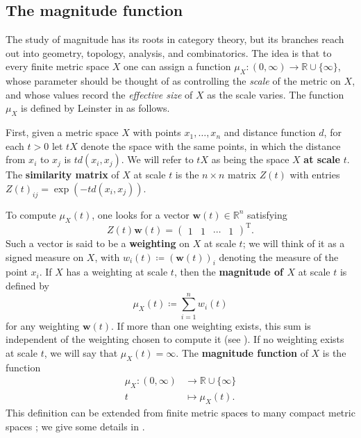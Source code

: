 \documentclass[a4paper, oneside, reqno]{amsart}
\theoremstyle{definition}
\theoremstyle{remark}
\numberwithin{equation}{section}
\renewcommand{\vec}{\mathbf}
\newcommand{\transpose}{\mathrm{T}}
\newcommand{\R}{\mathbb{R}}
\newcommand{\define}{\textbf}
\begin{document}

\subsection{The magnitude function}
\label{subsec:magnitude-function}

The study of magnitude has its roots in category theory, but its branches reach out into geometry, topology, analysis, and combinatorics. The idea is that to every finite metric space \(X\) one can assign a function \(\mu_X \colon (0, \infty) \to \R \cup \{\infty\}\), whose parameter should be thought of as controlling the \emph{scale} of the metric on \(X\), and whose values record the \emph{effective size} of \(X\) as the scale varies. The function \(\mu_X\) is defined by Leinster in \cite{LeinsterMagnitude2013} as follows.

First, given a metric space \(X\) with points \(x_1,\ldots, x_n\) and distance function \(d\), for each \(t > 0\) let \(tX\) denote the space with the same points, in which the distance from \(x_i\) to \(x_j\) is \(t d(x_i,x_j)\). We will refer to \(tX\) as being the space \(X\) \define{at scale} \(t\). The \define{similarity matrix} of \(X\) at scale \(t\) is the \(n \times n\) matrix \(Z(t)\) with entries \(Z(t)_{ij} = \exp(-td(x_i,x_j))\).

To compute \(\mu_X(t)\), one looks for a vector \(\vec{w}(t) \in \R^n\) satisfying 
\begin{equation}
\label{eq:weight_equation}
    Z(t) \vec{w}(t) = \begin{pmatrix} 1 & 1 & \cdots & 1 \end{pmatrix}^\transpose.
\end{equation}
Such a vector is said to be a \define{weighting} on \(X\) at scale \(t\); we will think of it as a signed measure on \(X\), with \(w_i(t) \coloneq (\vec{w}(t))_i\) denoting the measure of the point \(x_i\). 
If \(X\) has a weighting at scale \(t\), then the \define{magnitude of \(X\)} at scale \(t\) is defined by
\[\mu_X(t) \coloneq \sum_{i=1}^n w_i(t)\]
for any weighting \(\vec{w}(t)\). If more than one weighting exists, this sum is independent of the weighting chosen to compute it (see ). If no weighting exists at scale \(t\), we will say that \(\mu_X(t) = \infty\). The \define{magnitude function} of \(X\) is the function
\begin{align*}
\mu_X \colon (0, \infty) &\to \R \cup \{\infty\} \\
t &\mapsto \mu_X(t).
\end{align*}
This definition can be extended from finite metric spaces to many compact metric spaces \cite[\S 3]{LeinsterMagnitude2013}; we give some details in .
\end{document}
